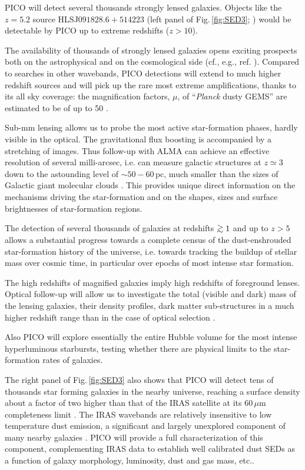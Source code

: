 \documentclass[11pt,a4paper]{article}
\def\simgt{\mathrel{\rlap{\lower 3pt\hbox{$\sim$}} \raise2.0pt\hbox{$>$}}}
\begin{document}
PICO will detect several thousands strongly lensed galaxies. Objects like the $z=5.2$ source HLSJ$091828.6+514223$ (left panel of Fig.\,\ref{fig:SED3}; \cite{Combes2012}) would be detectable by PICO up to extreme redshifts ($z>10$).

The availability of thousands of strongly lensed galaxies opens exciting prospects both on the astrophysical and on the cosmological side (cf., e.g., ref. \cite{Treu2010}). Compared to searches in other wavebands, PICO detections will extend to much higher redshift sources \cite[most optically-selected strongly lensed galaxies are at $z<1$, cf. Fig.\,7 of ref. ][]{Treu2010} and will pick up the rare most extreme amplifications, thanks to its all sky coverage: the magnification factors, $\mu$, of ``\textit{Planck} dusty GEMS'' are estimated to be of up to 50 \cite{Canameras2015}.

Sub-mm lensing allows us to probe the most active star-formation phases, hardly visible in the optical. The gravitational flux boosting is accompanied by a stretching of images. Thus follow-up  with ALMA can achieve an effective resolution of several milli-arcsec, i.e. can measure galactic structures at $z\simeq 3$ down to the astounding level of $\sim 50-60\,$pc, much smaller than the sizes of Galactic giant molecular clouds \cite{Canameras2017ALMA}. This provides unique direct information on the mechanisms driving the star-formation  and on the shapes, sizes and surface brightnesses of star-formation regions.

The detection of several thousands of galaxies at redshifts $\simgt 1$ and up to $z>5$ allows a substantial progress towards a complete census of the dust-enshrouded star-formation history of the universe, i.e. towards tracking the buildup of stellar mass over cosmic time, in particular over epochs of most intense star formation.

The high redshifts of magnified galaxies imply high redshifts of  foreground lenses. Optical follow-up will allow us to investigate the total (visible and dark) mass of the lensing galaxies, their density profiles, dark matter sub-structures in a much higher redshift range than in the case of optical selection \cite{Canameras2017lens}.

Also PICO will explore essentially the entire Hubble volume for the most intense hyperluminous starbursts, testing whether there are physical limits to the star-formation rates of galaxies.

The right panel of Fig.\,\ref{fig:SED3} also shows that PICO will detect tens of thousands star forming galaxies in the nearby universe, reaching a surface density about a factor of two higher than that of the IRAS satellite at its $60\,\mu$m completeness limit \cite{RowanRobinson1991}. The IRAS
wavebands  are relatively insensitive to low temperature dust emission,
a significant and largely unexplored component of many nearby galaxies \cite{Planck2011nearby_gal}. PICO will provide a full characterization of this component, complementing IRAS data to establish well calibrated dust SEDs as a function of galaxy morphology, luminosity, dust and gas mass, etc..
\end{document}
